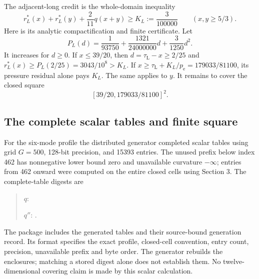 \documentclass[11pt]{amsart}
\numberwithin{equation}{section}
\newcommand{\pe}{p_{\mathrm e}}
\newcommand{\tL}{\tau_{\mathrm L}}
\begin{document}
The adjacent-long credit is the whole-domain inequality
\begin{equation}\label{eq:LLcredit}
 r_L^*(x)+r_L^*(y)+\frac2{11}q(x+y)
       \geq K_L:=\frac3{100000}\qquad(x,y\geq5/3).
\end{equation}
Here is its analytic compactification and finite certificate.
Let
\begin{equation}\label{eq:longP}
 P_L(d)=\frac1{93750}+\frac{1321}{24000000}d+\frac3{1250}d^2.
\end{equation}
It increases for $d\geq0$. If $x\leq39/20$, then
$d=\tL-x\geq2/25$ and
$r_L^*(x)\geq P_L(2/25)=3043/10^8>K_L$.
If $x\geq\tL+K_L/\pe=179033/81100$, its pressure residual
alone pays $K_L$. The same applies to $y$. It remains to cover
the closed square
\begin{equation}\label{eq:LLcore}
 [39/20,179033/81100]^2.
\end{equation}

\subsection{The complete scalar tables and finite square}

For the six-mode profile the distributed generator completed scalar
tables using grid $G=500$,
128-bit precision, and 15393 entries. The unused prefix below index
462 has nonnegative lower bound zero and unavailable curvature
$-\infty$; entries from 462 onward were computed on the entire
closed cells using Section 3. The complete-table digests are
\begin{quote}\footnotesize
$q$:

$q''$:
.
\end{quote}
The package includes the generated tables and their source-bound
generation record. Its format specifies the exact profile, closed-cell
convention, entry count, precision, unavailable prefix and byte order.
The generator rebuilds the enclosures; matching a stored digest alone
does not establish them. No twelve-dimensional covering claim is made
by this scalar calculation.
\end{document}

